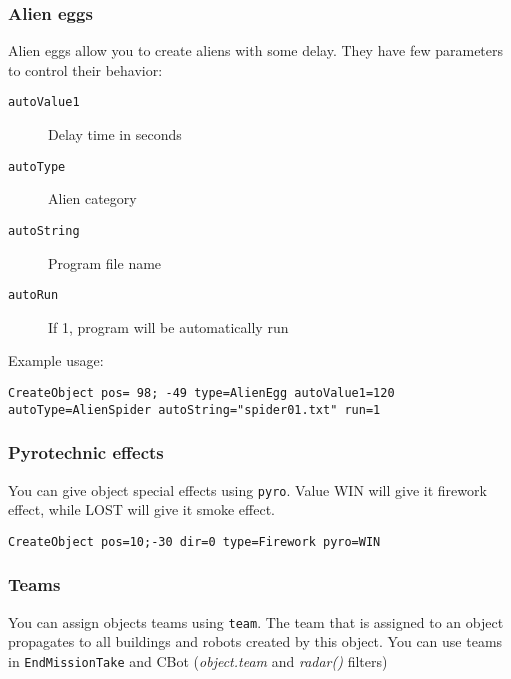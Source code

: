 \subsubsection{Alien eggs}

Alien eggs allow you to create aliens with some delay. They have few parameters to control their behavior:

\begin{description}
    \item[\texttt{autoValue1}] Delay time in seconds
    \item[\texttt{autoType}] Alien category
    \item[\texttt{autoString}] Program file name
    \item[\texttt{autoRun}] If 1, program will be automatically run
\end{description}

Example usage:

\begin{lstlisting}[style=scene]
CreateObject pos= 98; -49 type=AlienEgg autoValue1=120 autoType=AlienSpider autoString="spider01.txt" run=1
\end{lstlisting}


\subsubsection{Pyrotechnic effects}

You can give object special effects using \texttt{pyro}. Value WIN will give it firework effect, while LOST will give it smoke effect.

\begin{lstlisting}[style=scene]
CreateObject pos=10;-30 dir=0 type=Firework pyro=WIN
\end{lstlisting}


\subsubsection{Teams}


You can assign objects teams using \texttt{team}. The team that is assigned to an object propagates to all buildings and robots created by this object. You can use teams in \texttt{EndMissionTake} and CBot (\emph{object.team} and \emph{radar()} filters)

